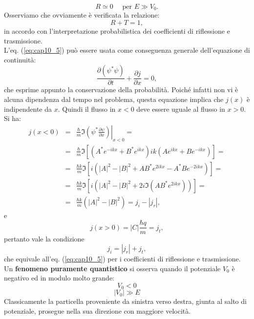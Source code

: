 \documentclass[a4paper,12pt,twoside]{book}
\begin{document}
\begin{equation}
R\simeq 0\quad  \textrm{ per } E\gg V_0.
\end{equation}
Osserviamo che ovviamente è verificata la relazione:
\begin{equation}
R+T=1,
\label{eq:cap10_5}
\end{equation}
in accordo con l'interpretazione probabilistica dei coefficienti di riflessione e trasmissione.\\
L'eq. (\ref{eq:cap10_5}) può essere usata come conseguenza generale dell'equazione di continuità:
\begin{equation}
\frac{\partial \left(\psi^* \psi \right)}{\partial t}+ \frac{\partial j}{\partial x}=0,
\end{equation}
che esprime appunto la conservazione della probabilità. Poiché infatti non vi è alcuna dipendenza dal tempo nel problema, questa equazione implica che $j(x)$ è indipendente da $x$. Quindi il flusso in $x<0$ deve essere uguale al flusso in $x>0$. Si ha:
\begin{eqnarray}
j\left( x<0 \right) &=& \frac{\hbar}{m} \Im \left. \left( \psi ^* \frac{\partial \psi}{\partial x} \right) \right| _{x<0} = \nonumber \\
&=& \frac{\hbar}{m} \Im \left[ \left( A^* e^{-ikx} + B^* e^{ikx}\right)ik \left( A e^{ikx} + B e^{-ikx}\right)\right]= \nonumber \\
&=&\frac{\hbar k}{m} \Im \left[ i\left( |A|^2 - |B|^2 +AB^* e^{2ikx}- A^* B e^{-2ikx}\right)\right]= \nonumber \\
&=&\frac{\hbar k}{m} \Im \left[ i\left( |A|^2 - |B|^2 +2i \Im \left( A B^* e^{2ikx}\right) \right)\right]= \nonumber \\
&=& \frac{\hbar k}{m}\left( |A|^2 - |B|^2\right)= j_i- |j_r|,
\end{eqnarray}
e
\begin{equation}
j\left( x>0 \right) = |C| \frac{\hbar q}{m}= j_t,
\end{equation}
pertanto vale la condizione
\begin{equation}
j_i = |j_r|+ j_t,
\end{equation}
che equivale all'eq. (\ref{eq:cap10_5}) per i coefficienti di riflessione e trasmissione.\\
Un \textbf{fenomeno puramente quantistico} si osserva quando il potenziale $V_0$ è negativo ed in modulo molto grande:
\[V_0<0\]
\[|V_0| \gg E\]
Classicamente la particella proveniente da sinistra verso destra, giunta al salto di potenziale, prosegue nella sua direzione con maggiore velocità.\\
\end{document}

